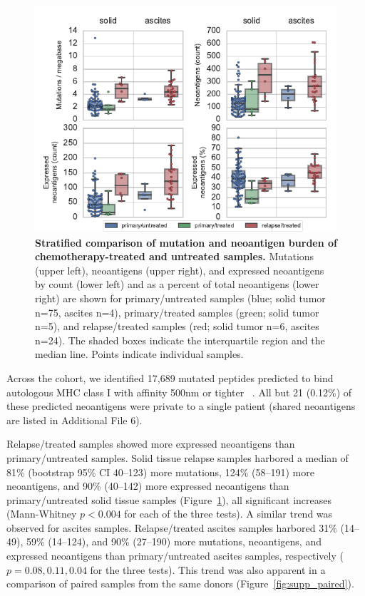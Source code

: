 \begin{figure}
\centering
\includegraphics[scale=1.0]{figures/counts.pdf}
\caption{\textbf{Stratified comparison of mutation and neoantigen burden of chemotherapy-treated and untreated samples.} Mutations (upper left), neoantigens (upper right), and expressed neoantigens by count (lower left) and as a percent of total neoantigens (lower right) are shown for primary/untreated samples (blue; solid tumor n=75, ascites n=4), primary/treated samples (green; solid tumor n=5), and relapse/treated samples (red; solid tumor n=6, ascites n=24). The shaded boxes indicate the interquartile region and the median line. Points indicate individual samples.}
\label{fig:counts}
\end{figure}

Across the cohort, we identified 17,689 mutated peptides predicted to bind autologous MHC class I with affinity 500nm or tighter ~\cite{Sette1994}. All but 21 (0.12\%) of these predicted neoantigens were private to a single patient (shared neoantigens are listed in Additional File 6).

Relapse/treated samples showed more expressed neoantigens than primary/untreated samples. Solid tissue relapse samples harbored a median of 81\% (bootstrap 95\% CI 40--123) more mutations, 124\% (58--191) more neoantigens, and 90\% (40--142) more expressed neoantigens than primary/untreated solid tissue samples (Figure~\ref{fig:counts}), all significant increases (Mann-Whitney $p < 0.004$ for each of the three tests). A similar trend was observed for ascites samples. Relapse/treated ascites samples harbored 31\% (14--49), 59\% (14--124), and 90\% (27--190) more mutations, neoantigens, and expressed neoantigens than primary/untreated ascites samples, respectively ($p=0.08, 0.11, 0.04$ for the three tests). This trend was also apparent in a comparison of paired samples from the same donors (Figure~\ref{fig:supp_paired}). 

